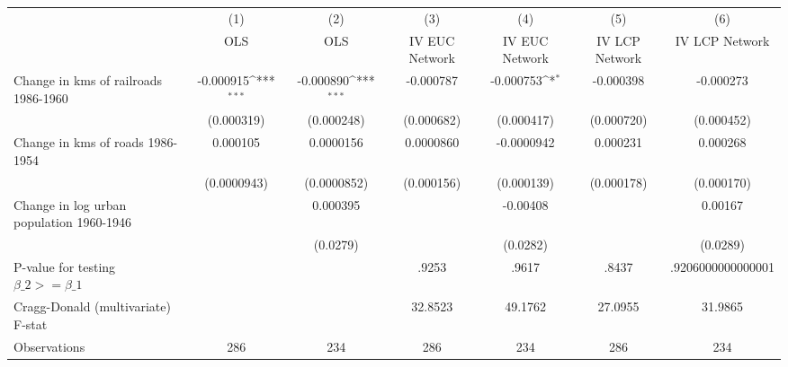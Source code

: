 {
\def\sym#1{\ifmmode^{#1}\else\(^{#1}\)\fi}
\begin{tabular}{l*{6}{c}}
\hline\hline
                &\multicolumn{1}{c}{(1)}&\multicolumn{1}{c}{(2)}&\multicolumn{1}{c}{(3)}&\multicolumn{1}{c}{(4)}&\multicolumn{1}{c}{(5)}&\multicolumn{1}{c}{(6)}\\
                &\multicolumn{1}{c}{OLS}&\multicolumn{1}{c}{OLS}&\multicolumn{1}{c}{IV EUC Network}&\multicolumn{1}{c}{IV EUC Network}&\multicolumn{1}{c}{IV LCP Network}&\multicolumn{1}{c}{IV LCP Network}\\
\hline
Change in kms of railroads 1986-1960&-0.000915\sym{***}&-0.000890\sym{***}&-0.000787         &-0.000753\sym{*}  &-0.000398         &-0.000273         \\
                &(0.000319)         &(0.000248)         &(0.000682)         &(0.000417)         &(0.000720)         &(0.000452)         \\
[1em]
Change in kms of roads 1986-1954& 0.000105         &0.0000156         &0.0000860         &-0.0000942         & 0.000231         & 0.000268         \\
                &(0.0000943)         &(0.0000852)         &(0.000156)         &(0.000139)         &(0.000178)         &(0.000170)         \\
[1em]
Change in log urban population 1960-1946&                  & 0.000395         &                  & -0.00408         &                  &  0.00167         \\
                &                  & (0.0279)         &                  & (0.0282)         &                  & (0.0289)         \\
\hline
P-value for testing $\beta\_{2} >= \beta\_{1}$&                  &                  &    .9253         &    .9617         &    .8437         &.9206000000000001         \\
Cragg-Donald (multivariate) F-stat&                  &                  &  32.8523         &  49.1762         &  27.0955         &  31.9865         \\
Observations    &      286         &      234         &      286         &      234         &      286         &      234         \\
\hline\hline
\end{tabular}
}

